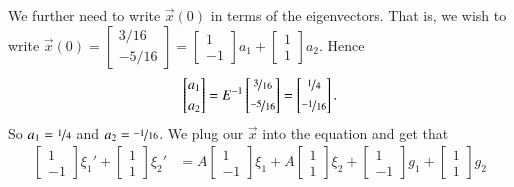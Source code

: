 \documentclass[12pt]{book}
\begin{document}
\begin{example}
We further need to write $\vec{x}(0)$ in terms of the eigenvectors.
That is, we wish to write $\vec{x}(0) = 
\left[ \begin{smallmatrix}
3/16 \\
-5/16
\end{smallmatrix} \right] = 
\left[ \begin{smallmatrix}
1 \\
-1
\end{smallmatrix} \right] a_1 +
\left[ \begin{smallmatrix}
1 \\
1
\end{smallmatrix} \right] a_2$.  Hence
\begin{equation*}
\begin{bmatrix}
a_1 \\
\noalign{\smallskip}
a_2
\end{bmatrix} = 
E^{-1}
\begin{bmatrix}
\nicefrac{3}{16} \\
\noalign{\smallskip}
\nicefrac{-5}{16}
\end{bmatrix}
=
\begin{bmatrix}
\nicefrac{1}{4} \\
\noalign{\smallskip}
\nicefrac{-1}{16}
\end{bmatrix} .
\end{equation*}
So $a_1 = \nicefrac{1}{4}$ and $a_2 = \nicefrac{-1}{16}$.
We plug our $\vec{x}$ into the equation and get that
\begin{equation*}
\begin{split}
\begin{bmatrix}
1 \\
-1
\end{bmatrix} \xi_1' +
\begin{bmatrix}
1 \\
1
\end{bmatrix} \xi_2'
& =
A
\begin{bmatrix}
1 \\
-1
\end{bmatrix} \xi_1 +
A
\begin{bmatrix}
1 \\
1
\end{bmatrix} \xi_2
+
\begin{bmatrix}
1 \\
-1
\end{bmatrix} g_1 +
\begin{bmatrix}
1 \\
1
\end{bmatrix} g_2

\end{split}
\end{equation*}
\end{example}
\end{document}
